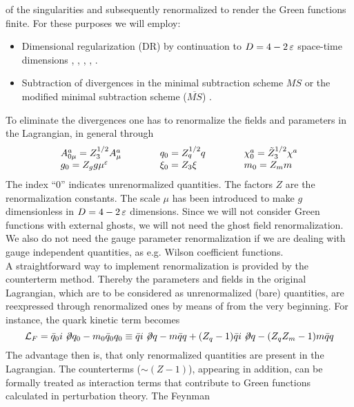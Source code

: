 of the singularities and subsequently renormalized to render
the Green functions finite. For these purposes we will employ:
\begin{itemize}
\item Dimensional regularization (DR) by continuation to $D=4-2\,\varepsilon$
space-time dimensions \cite{bollini:72a}, \cite{bollini:72b},
\cite{thooft:72b}, \cite{ashmore:72}, \cite{cicutamontaldi:72}.
\item Subtraction of divergences in the minimal subtraction scheme $MS$
\cite{thooft:73} or the modified minimal subtraction scheme
($\overline{MS}$) \cite{bardeen:78}.
\end{itemize}
To eliminate the divergences one has to renormalize the fields and
parameters in the Lagrangian, in general through
\begin{equation}\label{zqcd}
\begin{array}{lclcl}
A^a_{0\mu}=Z^{1/2}_3 A^a_\mu &\qquad& q_0=Z^{1/2}_q q &\qquad&
\chi^a_0=\tilde Z^{1/2}_3 \chi^a \\
g_0=Z_g g\mu^\varepsilon &\qquad& \xi_0=Z_3 \xi &\qquad& m_0=Z_m m
\end{array}
\end{equation}
The index ``0'' indicates unrenormalized quantities. The factors $Z$
are the renormalization constants. The scale $\mu$ has been introduced
to make $g$ dimensionless in $D=4-2\,\varepsilon$ dimensions. Since we will
not consider Green functions with external ghosts, we will not need
the ghost field renormalization. We also do not need the gauge
parameter renormalization if we are dealing with gauge independent
quantities, as e.g. Wilson coefficient functions.\\
A straightforward way to implement renormalization is provided by
the coun\-ter\-term method. Thereby the parameters and fields in the
original Lagrangian, which are to be considered as unrenormalized
(bare) quantities, are reexpressed through renormalized ones by
means of  from the very beginning. For instance, the quark
kinetic term becomes
\begin{equation}\label{ctm}
{\cal L}_F=\bar q_0 i\not\!\partial q_0-m_0\bar q_0 q_0\equiv
\bar q i\not\!\partial q-m\bar q q+(Z_q-1)\bar q i\not\!\partial q-
(Z_q Z_m-1)m\bar q q     \end{equation}
The advantage then is, that only renormalized quantities are present
in the Lagrangian. The counterterms ($\sim(Z-1)$), appearing in
addition, can be formally treated as interaction terms that contribute
to Green functions calculated in perturbation theory. The Feynman
